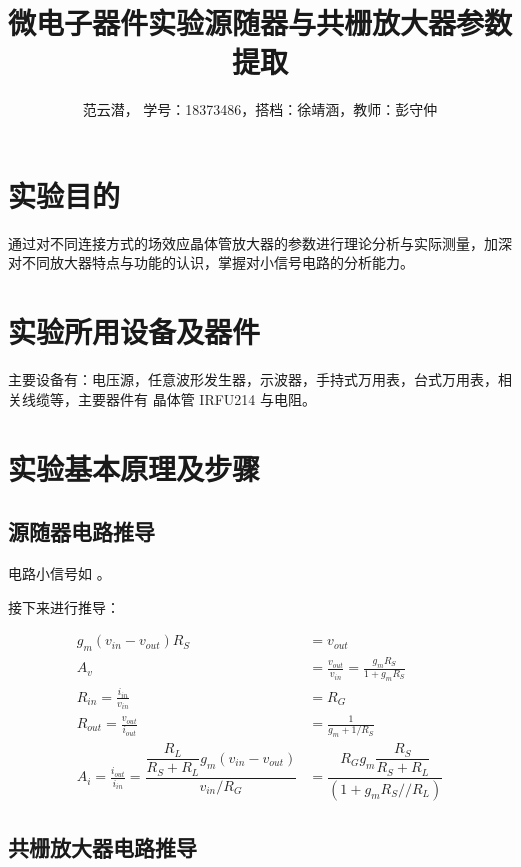 \documentclass[lang=cn,11pt,a4paper,cite=authoryear]{elegantpaper}
\title{微电子器件实验\quad 源随器与共栅放大器参数提取}
\author{范云潜， 学号：18373486，搭档：徐靖涵，教师：彭守仲}
\institute{微电子学院 184111 班}
\date{\zhtoday}
\begin{document}
\maketitle


\section{实验目的}


通过对不同连接方式的场效应晶体管放大器的参数进行理论分析与实际测量，加深对不同放大器特点与功能的认识，掌握对小信号电路的分析能力。


\section{实验所用设备及器件}

主要设备有：电压源，任意波形发生器，示波器，手持式万用表，台式万用表，相关线缆等，主要器件有 晶体管 IRFU214 与电阻。

\section{实验基本原理及步骤}

\subsection{源随器电路推导}

电路小信号如  。


接下来进行推导： 

\[\begin{aligned}
    g_m(v_{in} - v_{out}) R_S &= v_{out} \\
    A_v &= \frac{v_{out}}{v_{in}} = \frac{g_m R_S}{1 + g_m R_S} \\ 
    R_{in} = \frac{i_{in}}{v_{in}} &= R_G \\ 
    R_{out} = \frac{v_{out}}{i_{out}} &= \frac{1}{g_m + 1/R_S} \\ 
    A_i = \frac{i_{out}}{i_{in}} =  \dfrac{\dfrac{R_L}{R_S + R_L} g_m (v_{in} - v_{out})}{v_{in} / R_G} &= \dfrac{R_G g_m \dfrac{R_S}{R_S + R_L}}{ (1 + g_m {R_S // R_L})}
\end{aligned}\]

\subsection{共栅放大器电路推导}
\end{document}
